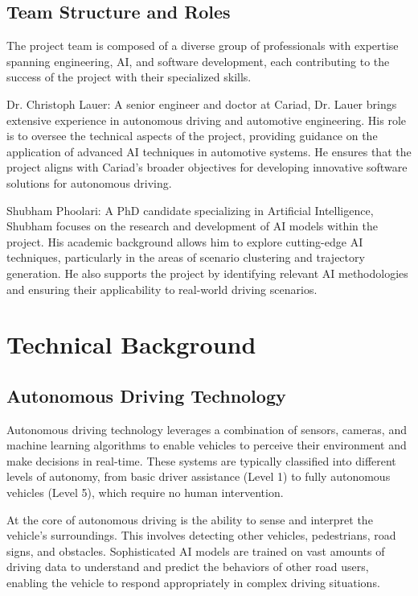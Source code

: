 \documentclass[12pt,a4paper]{report}
\begin{document}
\subsection{Team Structure and Roles}

The project team is composed of a diverse group of professionals with expertise spanning engineering, AI, and software development, each contributing to the success of the project with their specialized skills.

Dr. Christoph Lauer: A senior engineer and doctor at Cariad, Dr. Lauer brings extensive experience in autonomous driving and automotive engineering. His role is to oversee the technical aspects of the project, providing guidance on the application of advanced AI techniques in automotive systems. He ensures that the project aligns with Cariad’s broader objectives for developing innovative software solutions for autonomous driving.

Shubham Phoolari: A PhD candidate specializing in Artificial Intelligence, Shubham focuses on the research and development of AI models within the project. His academic background allows him to explore cutting-edge AI techniques, particularly in the areas of scenario clustering and trajectory generation. He also supports the project by identifying relevant AI methodologies and ensuring their applicability to real-world driving scenarios.


\section{Technical Background}
\subsection{Autonomous Driving Technology}

Autonomous driving technology leverages a combination of sensors, cameras, and machine learning algorithms to enable vehicles to perceive their environment and make decisions in real-time. These systems are typically classified into different levels of autonomy, from basic driver assistance (Level 1) to fully autonomous vehicles (Level 5), which require no human intervention.

At the core of autonomous driving is the ability to sense and interpret the vehicle's surroundings. This involves detecting other vehicles, pedestrians, road signs, and obstacles. Sophisticated AI models are trained on vast amounts of driving data to understand and predict the behaviors of other road users, enabling the vehicle to respond appropriately in complex driving situations.
\end{document}

